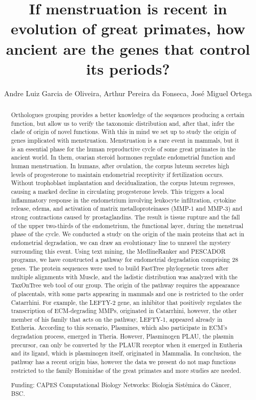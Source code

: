 \documentclass[twoside]{article}
\title{\vspace{-15mm}\fontsize{24pt}{10pt}\selectfont\textbf{ If menstruation is recent in evolution of great primates,  how ancient are the genes that control its periods? }} %
\author{ Andre Luiz Garcia de Oliveira, Arthur Pereira da Fonseca, Jos\'e Miguel Ortega }
\affil{ Universidade Federal de Minas Gerais }
\date{}
\begin{document}
  
  
  \maketitle %
  
  
  \thispagestyle{fancy} %
  
  
  \begin{abstract}
  Orthologues grouping provides a better knowledge of the sequences producing a certain function,  but allow us to verify the taxonomic distribution and,  after that,  infer the clade of origin of novel functions. With this in mind we set up to study the origin of genes implicated with menstruation. Menstruation is a rare event in mammals,  but it is an essential phase for the human reproductive cycle of some great primates in the ancient world. In them,  ovarian steroid hormones regulate endometrial function and human menstruation. In humans,  after ovulation,  the corpus luteum secretes high levels of progesterone to maintain endometrial receptivity if fertilization occurs. Without trophoblast implantation and decidualization,  the corpus luteum regresses,  causing a marked decline in circulating progesterone levels. This triggers a local inflammatory response in the endometrium involving leukocyte infiltration,  cytokine release,  edema,  and activation of matrix metalloproteinases (MMP-1 and MMP-3) and strong contractions caused by prostaglandins. The result is tissue rupture and the fall of the upper two-thirds of the endometrium,  the functional layer,  during the menstrual phase of the cycle.  We conducted a study on the origin of the main proteins that act in endometrial degradation,  we can draw an evolutionary line to unravel the mystery surrounding this event. Using text mining,  the MedlineRanker and PESCADOR programs,  we have constructed a pathway for endometrial degradation comprising 28 genes. The protein sequences were used to build FastTree phylogenetic trees after multiple alignments with Muscle,  and the ladistic distribution was analyzed with the TaxOnTree web tool of our group. The origin of the pathway requires the appearance of placentals,  with some parts appearing in mammals and one is restricted to the order Catarrhini. For example,  the LEFTY-2 gene,  an inhibitor that positively regulates the transcription of ECM-degrading MMPs,  originated in Catarrhini,  however,  the other member of his family that acts on the pathway,  LEFTY-1,  appeared already in Eutheria. According to this scenario,  Plasmines,  which also participate in ECM's degradation process,  emerged in Theria. However,  Plasminogen PLAU,  the plasmin precursor,  can only be converted by the PLAUR receptor when it emerged in Eutheria and its ligand,  which is plasminogen itself,  originated in Mammalia. In conclusion,  the pathway has a recent origin bias,  however the data we present do not map functions restricted to the family Hominidae of the great primates and more studies are needed.
  
  Funding: CAPES Computational Biology Networks: Biologia Sist\^emica do C\^ancer,  BSC. \\ 
  \end{abstract}
  
\end{document}
